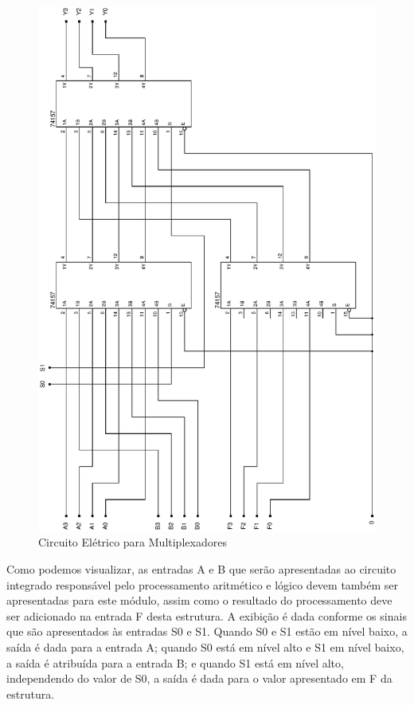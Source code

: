 \documentclass{article}
\begin{document}
\begin{figure}
    \centering{}
    \includegraphics[width=\textwidth]{ci74157.ps}
    \caption{Circuito Elétrico para Multiplexadores}
    \label{fig:ci74157}
\end{figure}

Como podemos visualizar, as entradas A e B que serão apresentadas ao circuito
integrado responsável pelo processamento aritmético e lógico devem também ser
apresentadas para este módulo, assim como o resultado do processamento deve ser
adicionado na entrada F desta estrutura. A exibição é dada conforme os sinais
que são apresentados às entradas S0 e S1. Quando S0 e S1 estão em nível baixo, a
saída é dada para a entrada A; quando S0 está em nível alto e S1 em nível baixo,
a saída é atribuída para a entrada B; e quando S1 está em nível alto,
independendo do valor de S0, a saída é dada para o valor apresentado em F da
estrutura.
\end{document}
